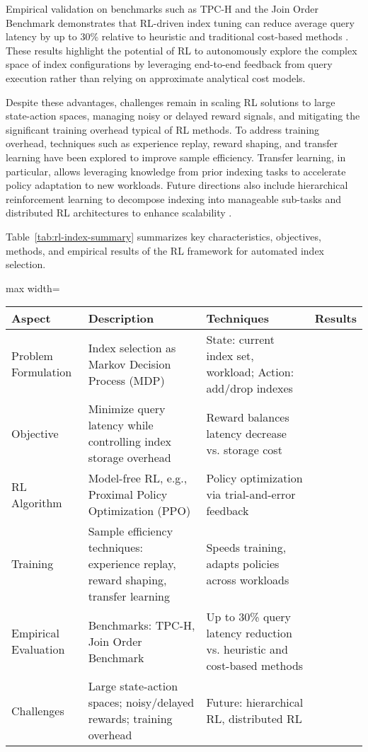 \documentclass[sigconf]{acmart}
\begin{document}
Empirical validation on benchmarks such as TPC-H and the Join Order Benchmark demonstrates that RL-driven index tuning can reduce average query latency by up to 30\% relative to heuristic and traditional cost-based methods \cite{ref33}. These results highlight the potential of RL to autonomously explore the complex space of index configurations by leveraging end-to-end feedback from query execution rather than relying on approximate analytical cost models.

Despite these advantages, challenges remain in scaling RL solutions to large state-action spaces, managing noisy or delayed reward signals, and mitigating the significant training overhead typical of RL methods. To address training overhead, techniques such as experience replay, reward shaping, and transfer learning have been explored to improve sample efficiency. Transfer learning, in particular, allows leveraging knowledge from prior indexing tasks to accelerate policy adaptation to new workloads. Future directions also include hierarchical reinforcement learning to decompose indexing into manageable sub-tasks and distributed RL architectures to enhance scalability \cite{ref33}.

Table~\ref{tab:rl-index-summary} summarizes key characteristics, objectives, methods, and empirical results of the RL framework for automated index selection.

\begin{table*}[htbp]
\centering
\caption{Summary of Reinforcement Learning Framework for Automated Index Selection}
\label{tab:rl-index-summary}
\begin{adjustbox}{max width=\textwidth}
\begin{tabular}{@{}llll@{}}
\toprule
Aspect & Description & Techniques & Results \\ \midrule
Problem Formulation & Index selection as Markov Decision Process (MDP) & State: current index set, workload; Action: add/drop indexes & \\[4pt]
Objective & Minimize query latency while controlling index storage overhead & Reward balances latency decrease vs. storage cost & \\[4pt]
RL Algorithm & Model-free RL, e.g., Proximal Policy Optimization (PPO) & Policy optimization via trial-and-error feedback & \\[4pt]
Training & Sample efficiency techniques: experience replay, reward shaping, transfer learning & Speeds training, adapts policies across workloads & \\[4pt]
Empirical Evaluation & Benchmarks: TPC-H, Join Order Benchmark & Up to 30\% query latency reduction vs. heuristic and cost-based methods \cite{ref33} & \\[4pt]
Challenges & Large state-action spaces; noisy/delayed rewards; training overhead & Future: hierarchical RL, distributed RL & \\ \bottomrule
\end{tabular}
\end{adjustbox}
\end{table*}
\end{document}
